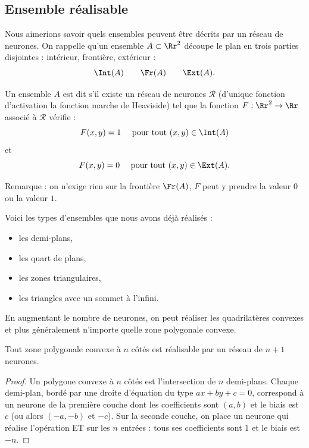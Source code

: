 \documentclass[11pt,class=report,crop=false]{standalone}
\begin{document}
\subsection{Ensemble réalisable}

Nous aimerions savoir quels ensembles peuvent être décrits par un réseau de neurones.
On rappelle qu'un ensemble $A \subset \Rr^2$ découpe le plan en trois parties disjointes : intérieur, frontière, extérieur :
$$\Int(A) \qquad \Fr(A) \qquad \Ext(A).$$


\begin{definition}
Un ensemble $A$ est dit  s'il existe un réseau de neurones $\mathcal{R}$ (d'unique fonction d'activation la fonction marche de Heaviside) tel que
la fonction $F : \Rr^2 \to \Rr$ associé à $\mathcal{R}$ vérifie :
$$F(x,y) = 1 \quad \text{ pour tout } (x,y) \in \Int(A)$$
et
$$F(x,y) = 0 \quad \text{ pour tout } (x,y) \in \Ext(A).$$
\end{definition}



Remarque : on n'exige rien sur la frontière $\Fr(A)$, $F$ peut y prendre la valeur $0$ ou la valeur $1$.


Voici les types d'ensembles que nous avons déjà réalisés :
\begin{itemize}
  \item les demi-plans,
  \item les \og{}quart de plans\fg{},
  \item les zones triangulaires,
  \item les triangles avec un sommet \og{}à l'infini\fg{}.
\end{itemize}



En augmentant le nombre de neurones, on peut réaliser les quadrilatères convexes et plus généralement n'importe quelle zone polygonale convexe.

\begin{proposition}
Tout zone polygonale convexe à $n$ côtés est réalisable par un réseau de $n+1$ neurones.
\end{proposition}


\begin{proof}
Un polygone convexe à $n$ côtés est l'intersection de $n$ demi-plans.
Chaque demi-plan, bordé par une droite d'équation du type $ax+by+c=0$, correspond à un neurone de la première couche dont les coefficients sont $(a,b)$ et le biais est $c$ (ou alors $(-a,-b)$ et $-c$).
Sur la seconde couche, on place un neurone qui réalise l'opération \og{}ET\fg{} sur les $n$ entrées : tous ses coefficients sont $1$ et le biais est $-n$.
\end{proof}
\end{document}
